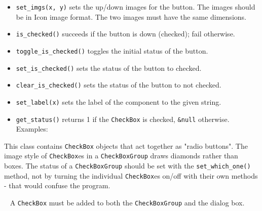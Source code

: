 \begin{itemize}
\item\noindent\texttt{set\_imgs(x, y)} sets the up/down images for the button. The images
should be in  Icon image format. The two images must have the same
dimensions.

\item\noindent\texttt{is\_checked()} succeeds if the button is down (checked); fail
otherwise.

\item\noindent\texttt{toggle\_is\_checked()} toggles the initial status of the button.

\item\noindent\texttt{set\_is\_checked()} sets the status of the button to checked.

\item\noindent\texttt{clear\_is\_checked()} sets the status of the button to not checked.

\item\noindent\texttt{set\_label(x)} sets the label of the component to the given
string.

\item\noindent\texttt{get\_status()} returns 1 if the  \texttt{CheckBox} is checked,
\texttt{\&null} otherwise.
Examples:

\end{itemize}

\medskip{}

This class contains \texttt{CheckBox} objects that act together as
"radio buttons". The image style of \texttt{CheckBox}es in a
 \texttt{CheckBoxGroup} draws diamonds rather
than boxes. The status of a  \texttt{CheckBoxGroup} should be set with the
\texttt{set\_which\_one()} method, not by turning the individual  \texttt{CheckBox}es
on/off with their own methods - that would confuse the program.

\medskip{}\ {\sffamily
A  \texttt{CheckBox} must be added to both the  \texttt{CheckBoxGroup} and the dialog box.}

